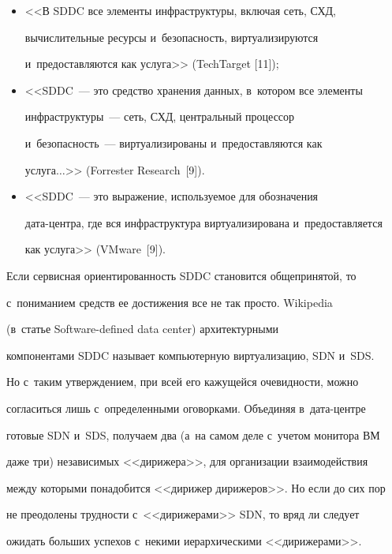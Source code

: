    \begin{itemize}


\item <<В SDDC все элементы инфраструктуры, включая сеть, СХД, 


вычислительные ресурсы и~безопасность, виртуализируются 


и~предоставляются как услуга>> (TechTarget [11]);


\item <<SDDC~--- это средство хранения данных, в~котором все элементы 


инфраструктуры~--- сеть, СХД, центральный процессор  


и~безопас\-ность~--- виртуализированы и~предостав\-ля\-ют\-ся как 


услуга$\ldots$>> (Forrester Research~[9]).


\item <<SDDC~--- это выражение, ис\-поль\-зу\-емое для обозначения  


да\-та-цент\-ра, где вся инфраструктура виртуализирована и~предостав\-ля\-ет\-ся 


как услуга>> (VMware~[9]).


    \end{itemize}


    


    Если сервисная ориентированность SDDC становится общепринятой, то 


с~пониманием средств ее достижения все не так просто. Wikipedia 


(в~\mbox{статье} Software-defined data center) архитектурными 


компонентами SDDC называет компьютерную виртуализацию, SDN и~SDS. 


Но с~таким утверждением, при всей его кажущейся оче\-вид\-ности, можно 


согласиться лишь с~определенными оговорками. Объединяя в~да\-та-цент\-ре 


готовые SDN и~SDS, получаем два (а~на самом деле с~учетом монитора ВМ 


даже три) независимых <<дирижера>>, для организации взаимодействия 


между которыми понадобится <<дирижер дирижеров>>. Но если до сих пор 


не преодолены трудности с~<<дирижерами>> SDN, то вряд ли следует 


ожидать больших успехов с~некими иерархическими <<дирижерами>>. 


